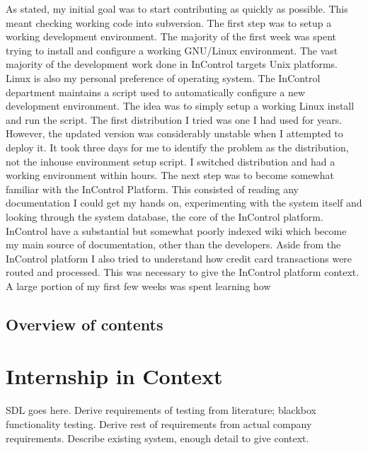 \documentclass[a4paper, 11pt, titlepage]{article}
\begin{document}
As stated, my initial goal was to start contributing as quickly as possible. This meant checking working code into subversion. The first step was to setup a working development environment. 
The majority of the first week was spent trying to install and configure a working GNU/Linux environment. The vast majority of the development work done in InControl targets Unix platforms. Linux is also my personal preference of operating system. The InControl department maintains a script used to automatically configure a new development environment. The idea was to simply setup a working Linux install and run the script. The first distribution I tried was one I had used for years. However, the updated version was considerably unstable when I attempted to deploy it. It took three days for me to identify the problem as the distribution, not the inhouse environment setup script. I switched distribution and had a working environment within hours. The next step was to become somewhat familiar with the InControl Platform. This consisted of reading any documentation I could get my hands on, experimenting with the system itself and looking through the system database, the core of the InControl platform.
InControl have a substantial but somewhat poorly indexed wiki which become my main source of documentation, other than the developers. Aside from the InControl platform I also tried to understand how credit card transactions were routed and processed. This was necessary to give the InControl platform context.
A large portion of my first few weeks was spent learning how 

\subsection{Overview of contents}


\section{Internship in Context}
SDL goes here. Derive requirements of testing from literature; blackbox functionality testing. Derive rest of requirements from actual company requirements. Describe existing system, enough detail to give context.
\end{document}
